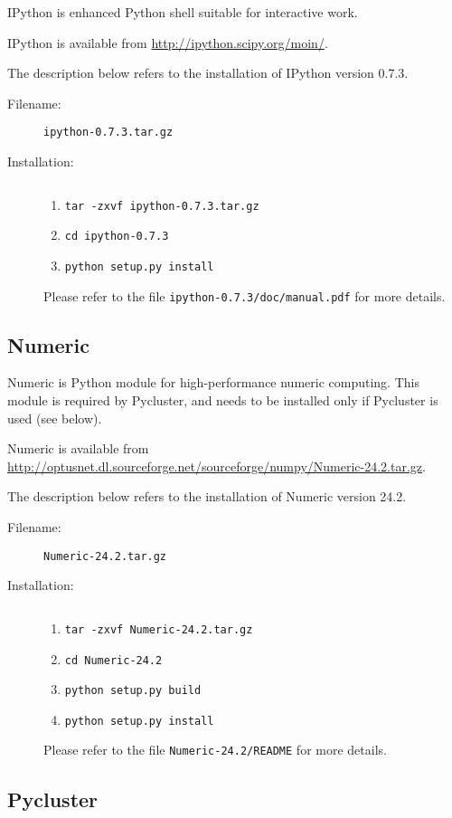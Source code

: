 IPython is enhanced Python shell suitable for interactive work.

IPython is available from \url{http://ipython.scipy.org/moin/}.

The description below refers to the installation of IPython version
0.7.3.

\begin{description}
\item [Filename:] {\tt ipython-0.7.3.tar.gz}
\item [Installation:] $ $
  \begin{enumerate}
  \item {\tt tar -zxvf ipython-0.7.3.tar.gz}
  \item {\tt cd ipython-0.7.3}
  \item {\tt python setup.py install}
  \end{enumerate}
Please refer to the file {\tt ipython-0.7.3/doc/manual.pdf} for more
details.
\end{description}

\subsection{Numeric}

Numeric is Python module for high-performance numeric computing.
This module is required by Pycluster, and needs to be installed
only if Pycluster is used (see below).

Numeric is available from
\url{http://optusnet.dl.sourceforge.net/sourceforge/numpy/Numeric-24.2.tar.gz}.

The description below refers to the installation of Numeric version
24.2.

\begin{description}
\item [Filename:] {\tt Numeric-24.2.tar.gz}
\item [Installation:] $ $
  \begin{enumerate}
  \item {\tt tar -zxvf Numeric-24.2.tar.gz}
  \item {\tt cd Numeric-24.2}
  \item {\tt python setup.py build}
  \item {\tt python setup.py install}
  \end{enumerate}
Please refer to the file {\tt Numeric-24.2/README} for more
details.
\end{description}

\subsection{Pycluster}

